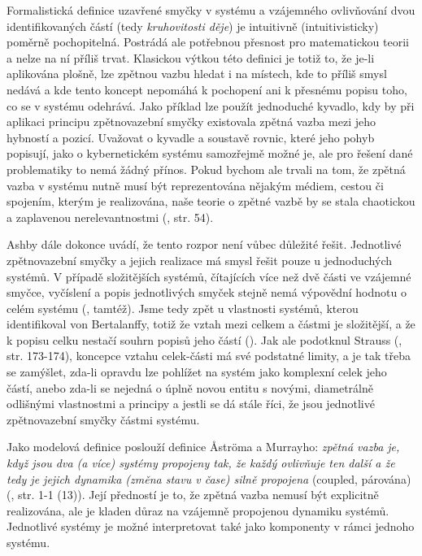 \documentclass[11pt,a4paper]{article}
\begin{document}
Formalistická definice uzavřené smyčky v systému a vzájemného ovlivňování dvou identifikovaných částí (tedy \textit{kruhovitosti děje}) je intuitivně (intuitivisticky) poměrně pochopitelná. Postrádá ale potřebnou přesnost pro matematickou teorii a nelze na ní příliš trvat. Klasickou výtkou této definici je totiž to, že je-li aplikována plošně, lze zpětnou vazbu hledat i na místech, kde to příliš smysl nedává a kde tento koncept nepomáhá k pochopení ani k přesnému popisu toho, co se v systému odehrává. Jako příklad lze použít jednoduché kyvadlo, kdy by při aplikaci principu zpětnovazební smyčky existovala zpětná vazba mezi jeho hybností a pozicí. Uvažovat o kyvadle a soustavě rovnic, které jeho pohyb popisují, jako o kybernetickém systému samozřejmě možné je, ale pro řešení dané problematiky to nemá žádný přínos. Pokud bychom ale trvali na tom, že zpětná vazba v systému nutně musí být reprezentována nějakým médiem, cestou či spojením, kterým je realizována, naše teorie o zpětné vazbě by se stala chaotickou a zaplavenou nerelevantnostmi (\cite{ashby_introduction_2015}, str. 54). 

Ashby dále dokonce uvádí, že tento rozpor není vůbec důležité řešit. Jednotlivé zpětnovazební smyčky a jejich realizace má smysl řešit pouze u jednoduchých systémů. V případě složitějších systémů, čítajících více než dvě části ve vzájemné smyčce, vyčíslení a popis jednotlivých smyček stejně nemá výpovědní hodnotu o celém systému (\cite*{ashby_introduction_2015}, tamtéž). Jsme tedy zpět u vlastnosti systémů, kterou identifikoval von Bertalanffy, totiž že vztah mezi celkem a částmi je složitější, a že k popisu celku nestačí souhrn popisů jeho částí (\cite*{von_bertalanffy_outline_1950}). Jak ale podotknul Strauss (\cite*{strauss_scope_2002}, str. 173-174), koncepce vztahu celek-části má své podstatné limity, a je tak třeba se zamýšlet, zda-li opravdu lze pohlížet na systém jako komplexní celek jeho částí, anebo zda-li se nejedná o úplně novou entitu s novými, diametrálně odlišnými vlastnostmi a principy a jestli se dá stále říci, že jsou jednotlivé zpětnovazební smyčky částmi systému.

Jako modelová definice poslouží definice Åströma a Murrayho: \textit{zpětná vazba je, když jsou dva (a více) systémy propojeny tak, že každý ovlivňuje ten další a že tedy je jejich dynamika (změna stavu v čase) silně propojena} (coupled, párována) (\cite*{astrom_feedback_2021}, str. 1-1 (13)). Její předností je to, že zpětná vazba nemusí být explicitně realizována, ale je kladen důraz na vzájemně propojenou dynamiku systémů. Jednotlivé systémy je možné interpretovat také jako komponenty v rámci jednoho systému.
\end{document}
